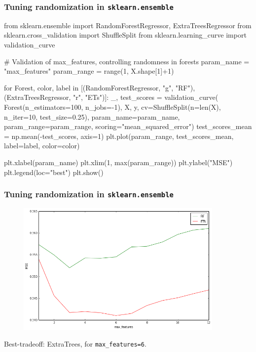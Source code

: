 \documentclass{beamer}
\begin{document}
\begin{frame}[fragile]
\frametitle{Tuning randomization in \texttt{sklearn.ensemble}}

{\scriptsize
\begin{pythoncode}
from sklearn.ensemble import RandomForestRegressor, ExtraTreesRegressor
from sklearn.cross_validation import ShuffleSplit
from sklearn.learning_curve import validation_curve

# Validation of max_features, controlling randomness in forests
param_name = "max_features"
param_range = range(1, X.shape[1]+1)

for Forest, color, label in [(RandomForestRegressor, "g", "RF"),
                             (ExtraTreesRegressor, "r", "ETs")]:
    _, test_scores = validation_curve(
        Forest(n_estimators=100, n_jobs=-1), X, y,
        cv=ShuffleSplit(n=len(X), n_iter=10, test_size=0.25),
        param_name=param_name, param_range=param_range,
        scoring="mean_squared_error")
    test_scores_mean = np.mean(-test_scores, axis=1)
    plt.plot(param_range, test_scores_mean, label=label, color=color)

plt.xlabel(param_name)
plt.xlim(1, max(param_range))
plt.ylabel("MSE")
plt.legend(loc="best")
plt.show()
\end{pythoncode}
}
\end{frame}


\begin{frame}[fragile]
\frametitle{Tuning randomization in \texttt{sklearn.ensemble}}

    \begin{figure}
        \includegraphics[width=0.9\textwidth]{./figures/randomness.png}
    \end{figure}

Best-tradeoff: ExtraTrees, for \texttt{max\_features=6}.
\end{frame}
\end{document}
